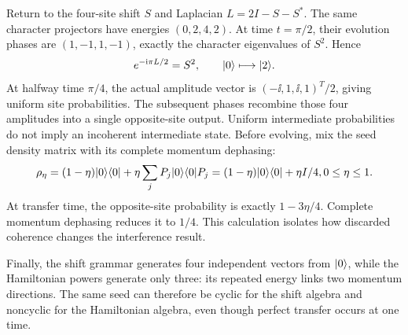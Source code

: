 Return to the four-site shift $S$ and Laplacian $L=2I-S-S^*$. The same character projectors have energies $(0,2,4,2)$. At time $t=\pi/2$, their evolution phases are $(1,-1,1,-1)$, exactly the character eigenvalues of $S^2$. Hence
\[
e^{-\ii\pi L/2}=S^2,\qquad
\ket0\longmapsto\ket2.
\]
At halfway time $\pi/4$, the actual amplitude vector is $(-\ii,1,\ii,1)^T/2$, giving uniform site probabilities. The subsequent phases recombine those four amplitudes into a single opposite-site output. Uniform intermediate probabilities do not imply an incoherent intermediate state.
Before evolving, mix the seed density matrix with its complete momentum dephasing:
\[
\rho_\eta=(1-\eta)\lvert 0\rangle\langle 0\rvert+\eta\sum_jP_j\lvert 0\rangle\langle 0\rvert P_j
=(1-\eta)\lvert 0\rangle\langle 0\rvert+\eta I/4,
0\le\eta\le1.
\]
At transfer time, the opposite-site probability is exactly $1-3\eta/4$. Complete momentum dephasing reduces it to $1/4$. This calculation isolates how discarded coherence changes the interference result.

Finally, the shift grammar generates four independent vectors from $\lvert 0\rangle$, while the Hamiltonian powers generate only three: its repeated energy links two momentum directions. The same seed can therefore be cyclic for the shift algebra and noncyclic for the Hamiltonian algebra, even though perfect transfer occurs at one time.


